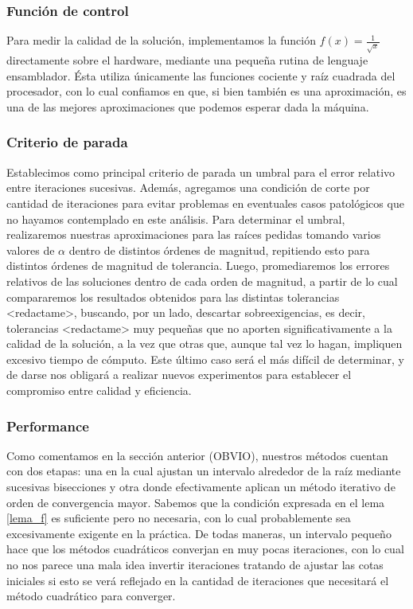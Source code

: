 	\subsubsection{Función de control}
Para medir la calidad de la solución, implementamos la función $f(x) = \frac{1}{\sqrt{x}}$ directamente sobre el hardware, mediante una pequeña rutina de lenguaje ensamblador. Ésta utiliza únicamente las funciones cociente y raíz cuadrada del procesador, con lo cual confiamos en que, si bien también es una aproximación, es una de las mejores aproximaciones que podemos esperar dada la máquina.

	\subsubsection{Criterio de parada}
Establecimos como principal criterio de parada un umbral para el error relativo entre iteraciones sucesivas. Además, agregamos una condición de corte por cantidad de iteraciones para evitar problemas en eventuales casos patológicos que no hayamos contemplado en este análisis. Para determinar el umbral, realizaremos nuestras aproximaciones para las raíces pedidas tomando varios valores de $\alpha$ dentro de distintos órdenes de magnitud, repitiendo esto para distintos órdenes de magnitud de tolerancia. Luego, promediaremos los errores relativos de las soluciones dentro de cada orden de magnitud, a partir de lo cual compararemos los resultados obtenidos para las distintas tolerancias <redactame>, buscando, por un lado, descartar sobreexigencias, es decir, tolerancias <redactame> muy pequeñas que no aporten significativamente a la calidad de la solución, a la vez que otras que, aunque tal vez lo hagan, impliquen excesivo tiempo de cómputo. Este último caso será el más difícil de determinar, y de darse nos 
obligará a realizar nuevos experimentos para establecer el compromiso entre calidad y eficiencia.

	\subsubsection{Performance}
Como comentamos en la sección anterior (OBVIO), nuestros métodos cuentan con dos etapas: una en la cual ajustan un intervalo alrededor de la raíz mediante sucesivas bisecciones y otra donde efectivamente aplican un método iterativo de orden de convergencia mayor. Sabemos que la condición expresada en el lema \ref{lema_f} es suficiente pero no necesaria, con lo cual probablemente sea excesivamente exigente en la práctica. De todas maneras, un intervalo pequeño hace que los métodos cuadráticos converjan en muy pocas iteraciones, con lo cual no nos parece una mala idea invertir iteraciones tratando de ajustar las cotas iniciales si esto se verá reflejado en la cantidad de iteraciones que necesitará el método cuadrático para converger.

